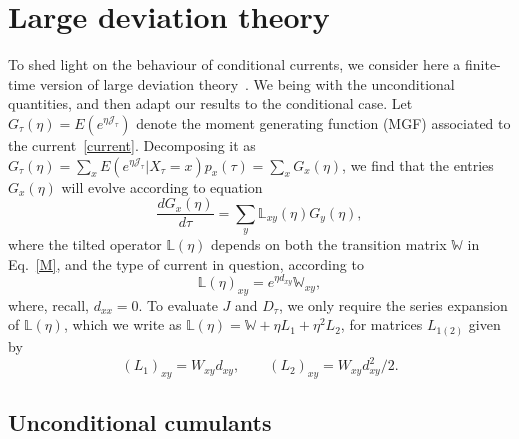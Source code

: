 \documentclass[aps,pre,reprint, amsmath, amssymb,superscriptaddress]{revtex4-1}
\begin{document}
%
%
\section{\label{sec:LDT}Large deviation theory}
%
%

To shed light on the behaviour of conditional currents, we consider here a finite-time version of large deviation theory~\cite{Touchette2009}.
We being with the unconditional quantities, and then adapt our results to the conditional case. 
Let $G_\tau(\eta) = E(e^{\eta \mathcal{J}_\tau})$ denote the  moment generating function (MGF) associated to the current~\eqref{current}. 
Decomposing it as 
$G_\tau(\eta) = \sum_{x} E(e^{\eta \mathcal{J}_\tau} |X_\tau = x) p_x(\tau) = \sum_x G_x(\eta)$, we find that the entries $G_x(\eta)$ will evolve according to equation
\begin{equation}\label{MGF_evol}
    \frac{dG_x(\eta)}{d\tau} =  \sum\limits_{y} \mathbb{L}_{xy}(\eta) G_y(\eta),
\end{equation}
where the tilted operator $\mathbb{L}(\eta)$  depends on both the transition matrix $\mathbb{W}$ in Eq.~\eqref{M}, and the type of current in question, according to 
\begin{equation}
    \mathbb{L}(\eta)_{xy} = e^{\eta d_{xy}} \mathbb{W}_{xy},
\end{equation}
where, recall, $d_{xx} = 0$.
To evaluate $J$ and $D_\tau$, we only require the series expansion of $\mathbb{L}(\eta)$, which we write as
$\mathbb{L}(\eta) = \mathbb{W} + \eta L_1 + \eta^2 L_2$, for matrices $L_{1(2)}$ given by 
\begin{equation}\label{L1L2}
    (L_1)_{xy} = W_{xy} d_{xy}, 
    \qquad 
    (L_2)_{xy} = W_{xy} d_{xy}^2/2.
\end{equation}

\subsection{Unconditional cumulants}
\end{document}
